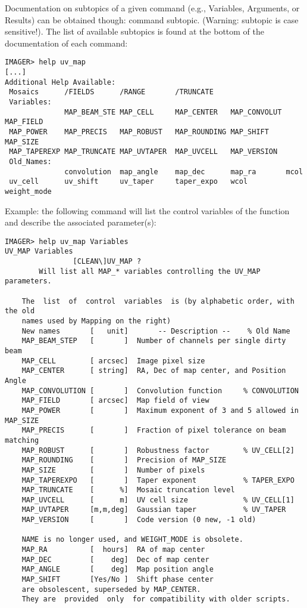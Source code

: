 Documentation on subtopics of a given command (e.g., Variables, 
Arguments, or Results) can be obtained though:  command 
subtopic. (Warning: subtopic is case sensitive!). The list of available 
subtopics is found at the bottom of the documentation of each command: 
\begin{verbatim} 
IMAGER> help uv_map
[...] 
Additional Help Available:
 Mosaics      /FIELDS      /RANGE       /TRUNCATE    
 Variables:
              MAP_BEAM_STE MAP_CELL     MAP_CENTER   MAP_CONVOLUT MAP_FIELD
 MAP_POWER    MAP_PRECIS   MAP_ROBUST   MAP_ROUNDING MAP_SHIFT    MAP_SIZE
 MAP_TAPEREXP MAP_TRUNCATE MAP_UVTAPER  MAP_UVCELL   MAP_VERSION  
 Old_Names:
              convolution  map_angle    map_dec      map_ra       mcol
 uv_cell      uv_shift     uv_taper     taper_expo   wcol         weight_mode  
\end{verbatim} 

Example: the following command will list the control variables of the 
 function and describe the associated parameter(s): 
\begin{verbatim} 
IMAGER> help uv_map Variables
UV_MAP Variables
                [CLEAN\]UV_MAP ?
        Will list all MAP_* variables controlling the UV_MAP parameters.
 
    The  list  of  control  variables  is (by alphabetic order, with the old
    names used by Mapping on the right)
    New names       [   unit]       -- Description --    % Old Name
    MAP_BEAM_STEP   [       ]  Number of channels per single dirty beam
    MAP_CELL        [ arcsec]  Image pixel size
    MAP_CENTER      [ string]  RA, Dec of map center, and Position Angle
    MAP_CONVOLUTION [       ]  Convolution function     % CONVOLUTION
    MAP_FIELD       [ arcsec]  Map field of view
    MAP_POWER       [       ]  Maximum exponent of 3 and 5 allowed in MAP_SIZE
    MAP_PRECIS      [       ]  Fraction of pixel tolerance on beam matching
    MAP_ROBUST      [       ]  Robustness factor        % UV_CELL[2]
    MAP_ROUNDING    [       ]  Precision of MAP_SIZE
    MAP_SIZE        [       ]  Number of pixels
    MAP_TAPEREXPO   [       ]  Taper exponent           % TAPER_EXPO
    MAP_TRUNCATE    [      %]  Mosaic truncation level
    MAP_UVCELL      [      m]  UV cell size             % UV_CELL[1]
    MAP_UVTAPER     [m,m,deg]  Gaussian taper           % UV_TAPER
    MAP_VERSION     [       ]  Code version (0 new, -1 old)
 
    NAME is no longer used, and WEIGHT_MODE is obsolete.
    MAP_RA          [  hours]  RA of map center
    MAP_DEC         [    deg]  Dec of map center
    MAP_ANGLE       [    deg]  Map position angle
    MAP_SHIFT       [Yes/No ]  Shift phase center
    are obsolescent, superseded by MAP_CENTER. 
    They are  provided  only  for compatibility with older scripts.
\end{verbatim} 

